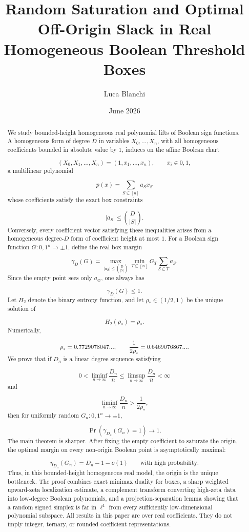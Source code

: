 \documentclass[11pt]{article}
\theoremstyle{definition}
\begin{document}
\title{Random Saturation and Optimal Off-Origin Slack in Real Homogeneous Boolean Threshold Boxes}
\author{Luca Blanchi}
\date{June 2026}

\maketitle

\begin{abstract}
We study bounded-height homogeneous real polynomial lifts of Boolean sign functions. A homogeneous form of degree $D$ in variables $X_0,\dots,X_n$, with all homogeneous coefficients bounded in absolute value by $1$, induces on the affine Boolean chart

\[
(X_0,X_1,\dots,X_n)=(1,x_1,\dots,x_n),
\qquad x_i\in{0,1},
\]
a multilinear polynomial

\[
p(x)=\sum_{S\subseteq[n]}a_Sx_S
\]
whose coefficients satisfy the exact box constraints

\[
|a_S|\le \binom{D}{|S|}.
\]
Conversely, every coefficient vector satisfying these inequalities arises from a homogeneous degree-$D$ form of coefficient height at most $1$. For a Boolean sign function $G:{0,1}^n\to{\pm1}$, define the real box margin

\[
\gamma_D(G)=
\max_{|a_S|\le \binom{D}{|S|}}
\min_{T\subseteq[n]}
G_T\sum_{S\subseteq T}a_S.
\]
Since the empty point sees only $a_\varnothing$, one always has

\[
\gamma_D(G)\le1.
\]
Let $H_2$ denote the binary entropy function, and let $\rho_*\in(1/2,1)$ be the unique solution of

\[
H_2(\rho_*)=\rho_*.
\]
Numerically,

\[
\rho_*=0.7729078047\ldots,
\qquad
\frac1{2\rho_*}=0.6469076867\ldots.
\]
We prove that if $D_n$ is a linear degree sequence satisfying

\[
0<\liminf_{n\to\infty}\frac{D_n}{n}
\le
\limsup_{n\to\infty}\frac{D_n}{n}
<\infty
\]
and

\[
\liminf_{n\to\infty}\frac{D_n}{n}>
\frac1{2\rho_*},
\]
then for uniformly random $G_n:{0,1}^n\to{\pm1}$,

\[
\Pr(\gamma_{D_n}(G_n)=1)\to1.
\]
The main theorem is sharper. After fixing the empty coefficient to saturate the origin, the optimal margin on every non-origin Boolean point is asymptotically maximal:

\[
\eta_{D_n}(G_n)=D_n-1-o(1)
\qquad\text{with high probability}.
\]
Thus, in this bounded-height homogeneous real model, the origin is the unique bottleneck. The proof combines exact minimax duality for boxes, a sharp weighted upward-zeta localization estimate, a complement transform converting high-zeta data into low-degree Boolean polynomials, and a projection-separation lemma showing that a random signed simplex is far in $\ell^1$ from every sufficiently low-dimensional polynomial subspace. All results in this paper are over real coefficients. They do not imply integer, ternary, or rounded coefficient representations.

\end{abstract}
\end{document}
